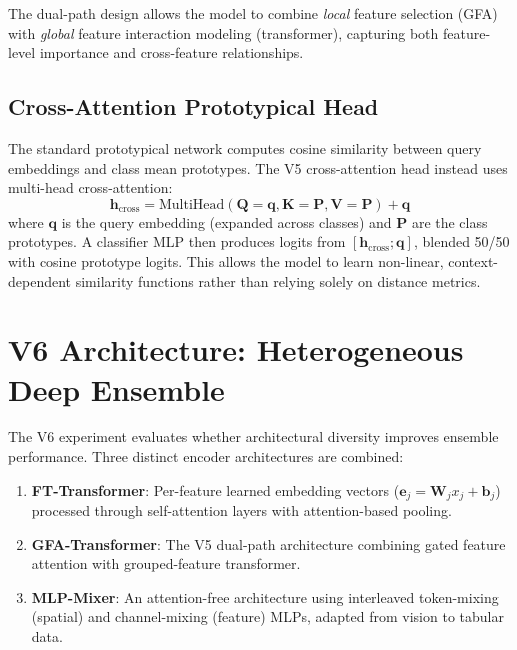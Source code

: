 The dual-path design allows the model to combine \emph{local} feature selection (GFA) with \emph{global} feature interaction modeling (transformer), capturing both feature-level importance and cross-feature relationships.

\subsection{Cross-Attention Prototypical Head}

The standard prototypical network computes cosine similarity between query embeddings and class mean prototypes. The V5 cross-attention head instead uses multi-head cross-attention:
\begin{equation}
\mathbf{h}_{\text{cross}} = \text{MultiHead}(\mathbf{Q}=\mathbf{q}, \mathbf{K}=\mathbf{P}, \mathbf{V}=\mathbf{P}) + \mathbf{q}
\end{equation}
where $\mathbf{q}$ is the query embedding (expanded across classes) and $\mathbf{P}$ are the class prototypes. A classifier MLP then produces logits from $[\mathbf{h}_{\text{cross}}; \mathbf{q}]$, blended 50/50 with cosine prototype logits. This allows the model to learn non-linear, context-dependent similarity functions rather than relying solely on distance metrics.

\section{V6 Architecture: Heterogeneous Deep Ensemble}
\label{sec:v6_architecture}

The V6 experiment evaluates whether architectural diversity improves ensemble performance. Three distinct encoder architectures are combined:

\begin{enumerate}
\item \textbf{FT-Transformer}: Per-feature learned embedding vectors ($\mathbf{e}_j = \mathbf{W}_j x_j + \mathbf{b}_j$) processed through self-attention layers with attention-based pooling.
\item \textbf{GFA-Transformer}: The V5 dual-path architecture combining gated feature attention with grouped-feature transformer.
\item \textbf{MLP-Mixer}: An attention-free architecture using interleaved token-mixing (spatial) and channel-mixing (feature) MLPs, adapted from vision to tabular data.
\end{enumerate}

